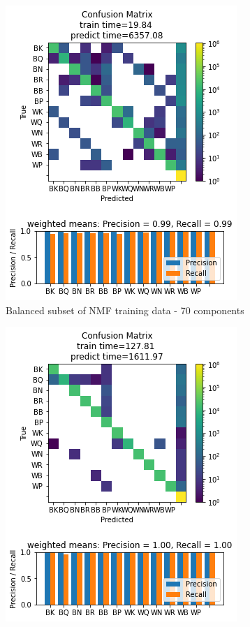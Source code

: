 \documentclass{article}
\newcommand{\NMFBL}{Balanced subset of NMF training data - 70 components}
\begin{document}
\begin{figure}[h]
\begin{subfigure}{0.33\textwidth}
\includegraphics[width=0.9\linewidth]{500NN_B_NMF70c_160x160_evaluation.png} 
\caption{\NMFBL}
\end{subfigure}
\begin{subfigure}{0.33\textwidth}
\includegraphics[width=0.9\linewidth]{500NN_PCA50c_160x160_evaluation.png}

\end{subfigure}
\end{figure}
\end{document}
